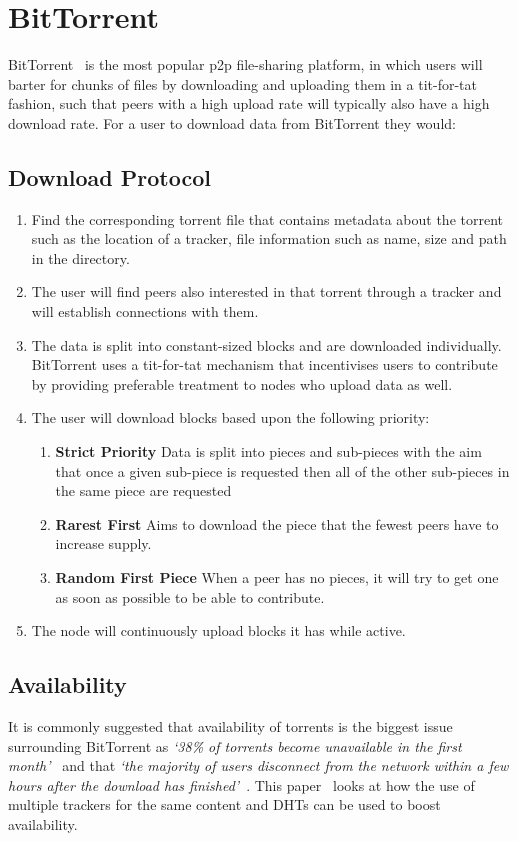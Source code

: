 
\section{BitTorrent}

BitTorrent~\cite{kaune_unraveling_2010,pouwelse_bittorrent_2005} is the most popular p2p file-sharing platform, in which users will barter for chunks of files by downloading and uploading them in a tit-for-tat fashion, such that peers with a high upload rate will typically also have a high download rate. For a user to download data from BitTorrent they would:

\subsection{Download Protocol}

\begin{enumerate}
  \item Find the corresponding \.torrent file that contains metadata about the torrent such as the location of a tracker, file information such as name, size and path in the directory.
  \item The user will find peers also interested in that torrent through a tracker and will establish connections with them.
  \item The data is split into constant-sized blocks and are downloaded individually. BitTorrent uses a tit-for-tat mechanism that incentivises users to contribute by providing preferable treatment to nodes who upload data as well.
  \item The user will download blocks based upon the following priority:
        \begin{enumerate}
          \item \textbf{Strict Priority} Data is split into pieces and sub-pieces with the aim that once a given sub-piece is requested then all of the other sub-pieces in the same piece are requested
          \item \textbf{Rarest First} Aims to download the piece that the fewest peers have to increase supply.
          \item \textbf{Random First Piece} When a peer has no pieces, it will try to get one as soon as possible to be able to contribute.
        \end{enumerate}
  \item The node will continuously upload blocks it has while active.
\end{enumerate}

\subsection{Availability}

It is commonly suggested that availability of torrents is the biggest issue surrounding BitTorrent as \textit{`38\% of torrents become unavailable in the first month'}~\cite{kaune_unraveling_2010} and that \textit{`the majority of users disconnect from the network within a few hours after the download has finished'}~\cite{pouwelse_bittorrent_2005}.
This paper~\cite{neglia_availability_2007} looks at how the use of multiple trackers for the same content and DHTs can be used to boost availability.

